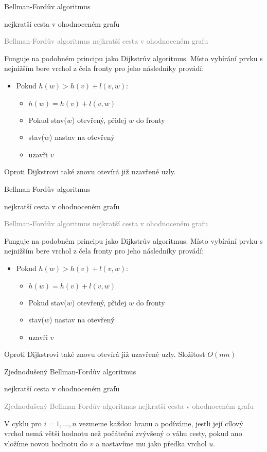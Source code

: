 \documentclass[20pt]{extarticle}
\newcommand{\card}[3][]{
	\vspace*{\fill}

	\newpage
	\topskip0pt
	\vspace*{\fill}
		\Large #2

		\vspace{1cm}
		\normalsize #1
	\vspace*{\fill}
	\newpage

	\small \textcolor{gray}{#2 #1}
	\topskip0pt
	\vspace*{\fill}

	\normalsize
	#3
	\vspace*{\fill}
}
\begin{document}
\begin{center}
\card[nejkratší cesta v ohodnoceném grafu]{Bellman-Fordův algoritmus}{
	Funguje na podobném principu jako Dijkstrův algoritmus. Místo vybírání
	prvku s nejnižším bere vrchol z čela fronty pro jeho následníky provádí:
	\begin{itemize}
		\item Pokud $h(w) > h(v) + l(v, w)$:
		\begin{itemize}
			\item $h(w) = h(v) + l(v, w)$
			\item Pokud stav($w$) \neq otevřený, přidej $w$ do fronty
			\item stav($w$) nastav na otevřený
			\item uzavři $v$
		\end{itemize}
	\end{itemize}
	Oproti Dijkstrovi také znovu otevírá již uzavřené uzly.
}

\card[nejkratší cesta v ohodnoceném grafu]{Bellman-Fordův algoritmus}{
	Funguje na podobném principu jako Dijkstrův algoritmus. Místo vybírání
	prvku s nejnižším bere vrchol z čela fronty pro jeho následníky provádí:
	\begin{itemize}
		\item Pokud $h(w) > h(v) + l(v, w)$:
		\begin{itemize}
			\item $h(w) = h(v) + l(v, w)$
			\item Pokud stav($w$) \neq otevřený, přidej $w$ do fronty
			\item stav($w$) nastav na otevřený
			\item uzavři $v$
		\end{itemize}
	\end{itemize}
	Oproti Dijkstrovi také znovu otevírá již uzavřené uzly. Složitost $O(nm)$
}

\card[nejkratší cesta v ohodnoceném grafu]{Zjednodušený Bellman-Fordův algoritmus}{
	V cyklu pro $i = 1, \dots, n$ vezmeme každou hranu a podíváme, jestli
	její cílový vrchol nemá větší hodnotu než počáteční zvývšený o váhu cesty, pokud ano
	vložíme novou hodnotu do $v$ a nastavíme mu jako předka vrchol $u$.
}

\end{center}
\end{document}
